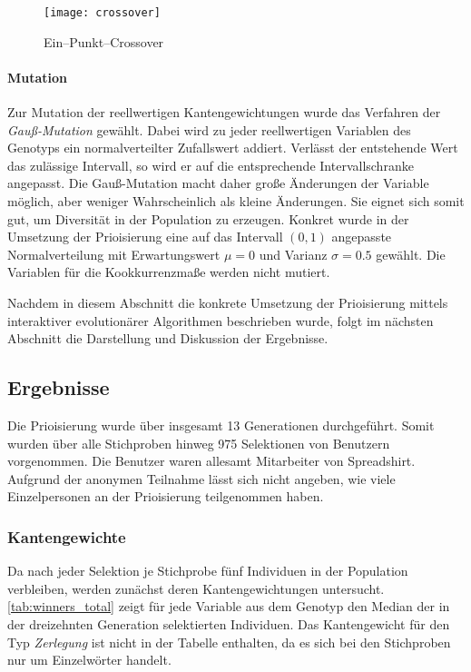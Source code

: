 \begin{figure}
\centering
\texttt{[image: crossover]}
\caption{Ein--Punkt--Crossover}
\label{fig:crossover}
\end{figure}

\paragraph{Mutation}

Zur Mutation der reellwertigen Kantengewichtungen wurde das Verfahren der \emph{Gauß-Mutation} \cite{kw2007} gewählt. Dabei wird zu jeder reellwertigen Variablen des Genotyps ein normalverteilter Zufallswert addiert. Verlässt der entstehende Wert das zulässige Intervall, so wird er auf die entsprechende Intervallschranke angepasst. Die Gauß-Mutation macht daher große Änderungen der Variable möglich, aber weniger Wahrscheinlich als kleine Änderungen. Sie eignet sich somit gut, um Diversität in der Population zu erzeugen. Konkret wurde in der Umsetzung der Prioisierung eine auf das Intervall \((0,1)\) angepasste Normalverteilung mit Erwartungswert \(\mu=0\) und Varianz \(\sigma=0.5\) gewählt. Die Variablen für die Kookkurrenzmaße werden nicht mutiert.

Nachdem in diesem Abschnitt die konkrete Umsetzung der Prioisierung mittels interaktiver evolutionärer Algorithmen beschrieben wurde, folgt im nächsten Abschnitt die Darstellung und Diskussion der Ergebnisse.

\subsection{Ergebnisse}

Die Prioisierung wurde über insgesamt \num{13} Generationen durchgeführt. Somit wurden über alle Stichproben hinweg \num{975} Selektionen von Benutzern vorgenommen. Die Benutzer waren allesamt Mitarbeiter von Spreadshirt. Aufgrund der anonymen Teilnahme lässt sich nicht angeben, wie viele Einzelpersonen an der Prioisierung teilgenommen haben.

\subsubsection{Kantengewichte}

Da nach jeder Selektion je Stichprobe fünf Individuen in der Population verbleiben, werden zunächst deren Kantengewichtungen untersucht. \cref{tab:winners_total} zeigt für jede Variable aus dem Genotyp den Median der in der dreizehnten Generation selektierten Individuen. Das Kantengewicht für den Typ \emph{Zerlegung} ist nicht in der Tabelle enthalten, da es sich bei den Stichproben nur um Einzelwörter handelt.

